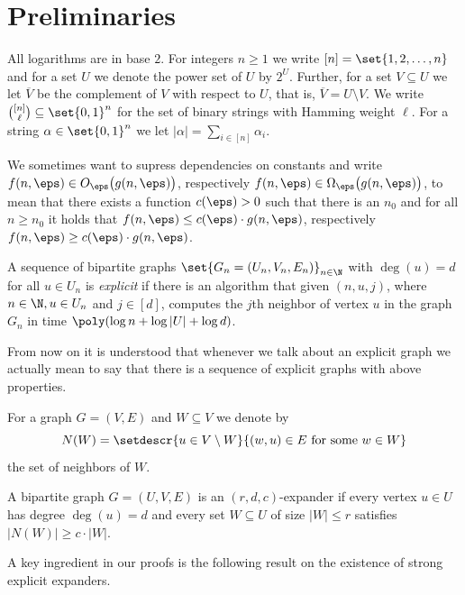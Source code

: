 \section{Preliminaries}
\label{sec:preliminaries}

All logarithms are in base $2$.  For integers $n \ge 1$ we write
$[n] = \set{1, 2, \ldots, n}$ and for a set $U$ we denote the power
set of $U$ by $2^{U}$. Further, for a set $V \subseteq U$ we let
$\overline V$ be the complement of $V$ with respect to $U$, that is,
$\overline V = U \setminus V$. We write
$\binom{[n]}{\ell} \subseteq \set{0,1}^n$ for the set of binary
strings with Hamming weight $\ell$. For a string
$\alpha \in \set{0,1}^n$ we let
$|\alpha| = \sum_{i \in [n]} \alpha_i$.

We sometimes want to supress dependencies on constants and write
$f(n, \eps) \in O_\eps\big(g(n, \eps)\big)$, respectively
$f(n, \eps) \in \Omega_\eps\big(g(n, \eps)\big)$, to mean that there
exists a function $c(\eps) > 0$ such that there is an $n_0$ and for all
$n \ge n_0$ it holds that $f(n, \eps) \le c(\eps) \cdot g(n, \eps)$,
respectively $f(n, \eps) \ge c(\eps)\cdot g(n, \eps)$.

\begin{definition}\label{def:explicit}
  A sequence of bipartite graphs $\set{G_n=(U_n, V_n, E_n)}_{n\in \N}$
  with $\deg(u) =d$ for all $u \in U_n$ is \emph{explicit} if there is
  an algorithm that given $(n, u, j)$, where $n \in \N, u \in U_n$ and
  $j\in [d]$, computes the $j$th neighbor of vertex $u$ in the graph
  $G_n$ in time $\poly(\log n + \log |U| + \log d)$.
\end{definition}

From now on it is understood that whenever we talk about an explicit
graph we actually mean to say that there is a sequence of explicit
graphs with above properties.

For a graph $G = (V, E)$ and $W \subseteq V$ we denote by
\[
  N(W) = \setdescr{u \in V \setminus W}{(w,u) \in E \text{ for some } w
    \in W}
\]
the set of neighbors of $W$.

\begin{definition}
  A bipartite graph $G = (U, V, E)$ is an $(r, d, c)$-expander if every
  vertex $u \in U$ has degree $\deg(u) = d$ and every set
  $W \subseteq U$ of size $|W| \le r$ satisfies $|N(W)| \ge c \cdot |W|$.
\end{definition}

A key ingredient in our proofs is the following result on the
existence of strong explicit expanders.

